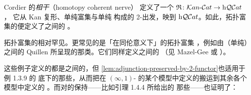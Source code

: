 \begin{example}\label{exa:adjunctions-topological-categories}
Cordier 的\emph{\trHomotopy{}相干\trNerve}（homotopy coherent nerve）
\cite{bib29,bib30} 定义了一个\trTwoFunctor
$\mathfrak{R}\colon\mathcal{K}an\text{-}\mathcal{C}at\to\mathrm{h}\mathcal{Q}\mathcal{C}at$，
它从 Kan 复形\trEnrichedCategory{}、单纯富集\trFunctor{}与单纯%
\trNaturalTransformation{}构成的 2-\trCategory{}出发，映到\trHomotopyTwoCategory{}
$\mathrm{h}\mathcal{Q}\mathcal{C}at$。如此，拓扑富集的\trAdjunction{}便定义了\trQuasiCategory{}之间的%
\trAdjunction{}。
\end{example}

\begin{example}\label{exa:quillen-adjunctions}
拓扑富集的\trAdjunction{}相对罕见。更常见的是「在同伦意义下」的拓扑富集%
\trAdjunction{}，例如由（单纯）\trModelCategory{}之间的 Quillen \trAdjunction{}%
所呈现的那类。它们同样定义\trQuasiCategory{}之间的\trAdjunction{}
（见 Mazel-Gee \cite{bib85} 或 \cite[\S 6.2]{bib108}）。
\end{example}

这些例子定义的都是\trQuasiCategory{}之间的\trAdjunction{}，但%
\cref{lem:adjunction-preserved-by-2-functor}也适用于例 1.3.9 的%
\trCosmologicalFunctor{}底下的那些\trTwoFunctor{}，从而把在 $(\infty,1)$-%
\trCategory{}的某个模型中定义的\trAdjunction{}搬运到其余各个模型中定义的%
\trAdjunction{}。而\trTwoFunctor{}对\trAdjunction{}的保持——比如引理 1.4.4 所给出的
那些——也证明了：


